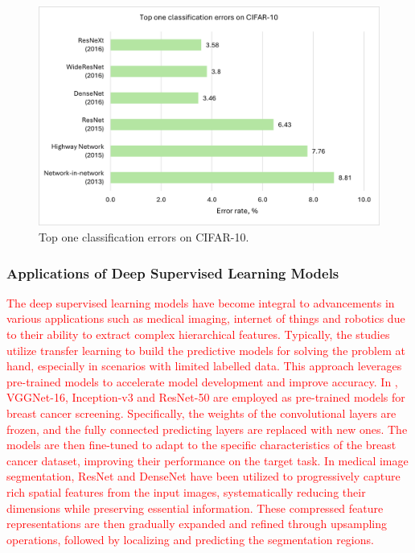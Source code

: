 \documentclass[preprint,12pt]{elsarticle}
\begin{document}
\begin{figure}[h!]
    \centering
    \includegraphics[scale=0.8]{fig_cnn_top_one_errors_cifar10.png}
    \caption{Top one classification errors on CIFAR-10.}
    \label{fig_cnn_top_one_errors_cifar10}
\end{figure}


\subsubsection{Applications of Deep Supervised Learning Models}
\textcolor{red}{The deep supervised learning models have become integral to advancements in various applications such as medical imaging, internet of things and robotics due to their ability to extract complex hierarchical features. Typically, the studies utilize transfer learning to build the predictive models for solving the problem at hand, especially in scenarios with limited labelled data. This approach leverages pre-trained models to accelerate model development and improve accuracy. In \citep{chougrad_deep_2018}, VGGNet-16, Inception-v3 and ResNet-50 are employed as pre-trained models for breast cancer screening. Specifically, the weights of the convolutional layers are frozen, and the fully connected predicting layers are replaced with new ones. The models are then fine-tuned to adapt to the specific characteristics of the breast cancer dataset, improving their performance on the target task. In medical image segmentation, ResNet \citep{zhao_novel_2020} and DenseNet \citep{cinar_hybrid_2022} have been utilized to progressively capture rich spatial features from the input images, systematically reducing their dimensions while preserving essential information. These compressed feature representations are then gradually expanded and refined through upsampling operations, followed by localizing and predicting the segmentation regions.}
\end{document}
